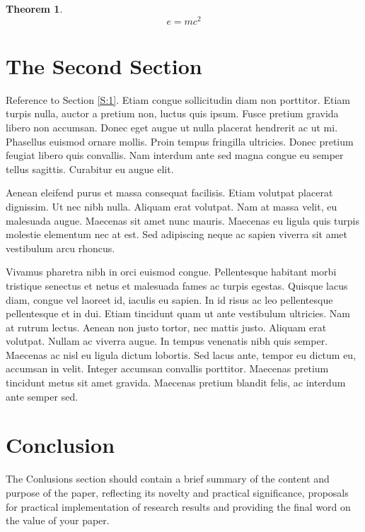 \documentclass[final,11pt,3p]{elsarticle}
\newtheorem{theorem}{Theorem}
\begin{document}
\begin{theorem}
\begin{equation}
\label{eq:emc}
e = mc^2
\end{equation}
\end{theorem}

\section{The Second Section}
\label{S:2}

Reference to Section \ref{S:1}. Etiam congue sollicitudin diam non porttitor. Etiam turpis nulla, auctor a pretium non, luctus quis ipsum. Fusce pretium gravida libero non accumsan. Donec eget augue ut nulla placerat hendrerit ac ut mi. Phasellus euismod ornare mollis. Proin tempus fringilla ultricies. Donec pretium feugiat libero quis convallis. Nam interdum ante sed magna congue eu semper tellus sagittis. Curabitur eu augue elit.

Aenean eleifend purus et massa consequat facilisis. Etiam volutpat placerat dignissim. Ut nec nibh nulla. Aliquam erat volutpat. Nam at massa velit, eu malesuada augue. Maecenas sit amet nunc mauris. Maecenas eu ligula quis turpis molestie elementum nec at est. Sed adipiscing neque ac sapien viverra sit amet vestibulum arcu rhoncus.

Vivamus pharetra nibh in orci euismod congue. Pellentesque habitant morbi tristique senectus et netus et malesuada fames ac turpis egestas. Quisque lacus diam, congue vel laoreet id, iaculis eu sapien. In id risus ac leo pellentesque pellentesque et in dui. Etiam tincidunt quam ut ante vestibulum ultricies. Nam at rutrum lectus. Aenean non justo tortor, nec mattis justo. Aliquam erat volutpat. Nullam ac viverra augue. In tempus venenatis nibh quis semper. Maecenas ac nisl eu ligula dictum lobortis. Sed lacus ante, tempor eu dictum eu, accumsan in velit. Integer accumsan convallis porttitor. Maecenas pretium tincidunt metus sit amet gravida. Maecenas pretium blandit felis, ac interdum ante semper sed.


\section{Conclusion}
The Conlusions section should contain a brief summary of the content and purpose of the paper, reflecting its novelty and practical significance, proposals for practical implementation of research results and providing the final word on the value of your paper.
\end{document}
